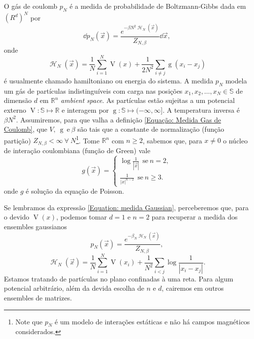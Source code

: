 \documentclass[11pt,twocolumn]{article}
\newcommand{\mmany}[2]{ #1_1, #1_2, \dots, #1_#2 }
\DeclareMathOperator{\Hf}{\mathcal{H}}
\DeclareMathOperator{\g}{g}
\DeclareMathOperator{\V}{V}
\newcommand{\R}{\mathbb{R}}
\newcommand{\p}{p} %
\newcommand{\Se}{\mathbb{S}}
\numberwithin{equation}{section} %
\begin{document}

O gás de coulomb $\p_N$ \cite{ChafaCoulombMeasure} é a medida de probabilidade de Boltzmann-Gibbs dada em $(R^d)^N$ por 
\begin{equation}
	\dd \p_N(\vec{x}) = \frac{e^{-\beta N^2 \Hf_N(\vec{x})}}{Z_{N,\beta}} \dd \vec{x},
	\label{Equação: Medida Gas de Coulomb}
\end{equation}
onde $$\Hf_N(\vec{x}) = \frac{1}{N} \sum_{i = 1}^{N} \V(x) + \frac{1}{2N^2} \sum_{i \neq j} \g(x_i - x_j)$$ é usualmente chamado hamiltoniano ou energia do sistema. A medida $\p_N$ modela um gás de partículas indistinguíveis com carga nas posições $\mmany{x}{N} \in \Se$ de dimensão $d$ em $\R^n$ \textit{ambient space}. As partículas estão sujeitas a um potencial externo $\V \colon \Se \mapsto \R$ e interagem por $\g \colon \Se \mapsto (-\infty, \infty]$. A temperatura inversa é $\beta N^2$. Assumiremos, para que valha a definição \ref{Equação: Medida Gas de Coulomb}, que $V, \ \g \ \text{e} \ \beta$ são tais que a constante de normalização (função partição) $Z_{N, \beta} < \infty \ \forall \ N$\footnote{Note que $\p_N$ é um modelo de interações estáticas e não há campos magnéticos considerados.}. Tome $\R^n$ com $n \geq 2$, sabemos que, para $x \neq 0$ o núcleo de interação coulombiana (função de Green) vale $$
g(\vec{x}) =
\begin{cases}
	\log \frac{1}{|\vec{x}|} \ \ \text{se} \ n = 2,\\
	\frac{1}{|x|^{n-2}} \ \ \text{se} \ n \geq 3.
\end{cases}
$$ onde $g$ é solução da equação de Poisson.

Se lembramos da expressão \ref{Equation: medida Gaussian}, perceberemos que, para o devido $\V(x)$, podemos tomar $d=1$ e $n = 2$ para recuperar a medida dos ensembles gaussianos 
\begin{equation}
	\p_N(\vec{x}) = \frac{e^{-\beta_N \Hf_N(\vec{x})}}{Z_{N,\beta}},
	\label{Equation: Medida Log V}
\end{equation}
\begin{equation}
	\Hf_N(\vec{x}) = \frac{1}{N} \sum_{i = 1}^{N} \V(x_i) + \frac{1}{N^2} \sum_{i < j} \log{\frac{1}{|x_i - x_j|}}.
\end{equation}
Estamos tratando de partículas no plano confinadas à uma reta. Para algum potencial arbitrário, além da devida escolha de $n$ e $d$, cairemos em outros ensembles de matrizes.
\end{document}
